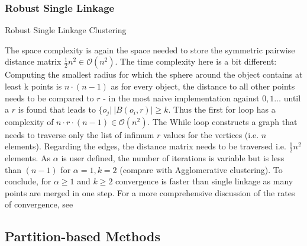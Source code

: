 \subsubsection{Robust Single Linkage}
\begin{algorithm}[htp]
    \hrulealg
\caption{Robust Single Linkage Clustering}\label{robust}
\end{algorithm}
The space complexity is again the space needed to store the symmetric pairwise distance matrix $\frac{1}{2}n^2 \in \mathcal{O}(n^2)$. The time complexity here is a bit different: Computing the smallest radius for which the sphere around the object contains at least k points is $n \cdot (n - 1)$ as for every object, the distance to all other points needs to be compared to $r$ - in the most naive implementation against $0, 1 \dots$ until a $r$ is found that leads to $\{o_j | \ |B(o_i, r)| \geq k$. Thus the first for loop has a complexity of $n \cdot r \cdot (n-1) \in \mathcal{O}(n^2)$. The While loop constructs a graph that needs to traverse only the list of infimum $r$ values for the vertices (i.e. $n$ elements). Regarding the edges, the distance matrix needs to be traversed i.e. $\frac{1}{2}n^2$ elements. As $\alpha$ is user defined, the number of iterations is variable but is less than $(n-1)$ for $\alpha = 1, k = 2$ (compare with Agglomerative clustering). To conclude, for $\alpha \geq 1$ and $k \geq 2$ convergence is faster than single linkage as many points are merged in one step. For a more comprehensive discussion of the rates of convergence, see~\cite{Chaudhuri2010RatesOC}



\subsection{Partition-based Methods}
